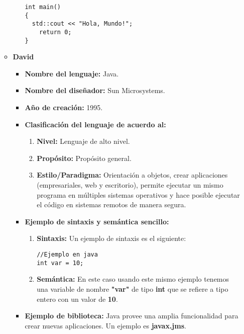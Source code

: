 \documentclass[11pt,letterpaper]{article}
\begin{document}
\begin{enumerate}
\begin{itemize}
\begin{itemize}
\begin{verbatim}
int main()
{
  std::cout << "Hola, Mundo!";
    return 0;
}
\end{verbatim}

                \end{itemize}
          \item \textbf{David}
                \begin{itemize}
                  \item \textbf{Nombre del lenguaje:} Java.
                  \item \textbf{Nombre del diseñador:} Sun Microsystems.
                  \item \textbf{Año de creación:} 1995.
                  \item \textbf{Clasificación del lenguaje de acuerdo al:}
                        \begin{enumerate}
                          \item \textbf{Nivel:} Lenguaje de alto nivel.
                          \item \textbf{Propósito:} Propósito general.
                          \item \textbf{Estilo/Paradigma:} Orientación a
                                objetos, crear aplicaciones (empresariales, web
                                y escritorio), permite ejecutar un mismo programa
                                en múltiples sistemas operativos y hace posible
                                ejecutar el código en sistemas remotos de manera
                                segura.
                        \end{enumerate}
                  \item \textbf{Ejemplo de sintaxis y semántica sencillo:}
                        \begin{enumerate}
                          \item \textbf{Sintaxis:} Un ejemplo de sintaxis es el
                                siguiente:
\begin{verbatim}
//Ejemplo en java
int var = 10;
\end{verbatim}
                          \item \textbf{Semántica:} En este caso usando este
                                mismo ejemplo tenemos una variable de nombre
                                \textbf{"var"} de tipo \textbf{int} que se
                                refiere a tipo entero con un valor de
                                \textbf{10}.
                        \end{enumerate}
                  \item \textbf{Ejemplo de biblioteca:} Java provee una amplia
                        funcionalidad para crear nuevas aplicaciones. Un ejemplo
                        es \textbf{javax.jms}.


\end{itemize}
\end{itemize}
\end{enumerate}
\end{document}
